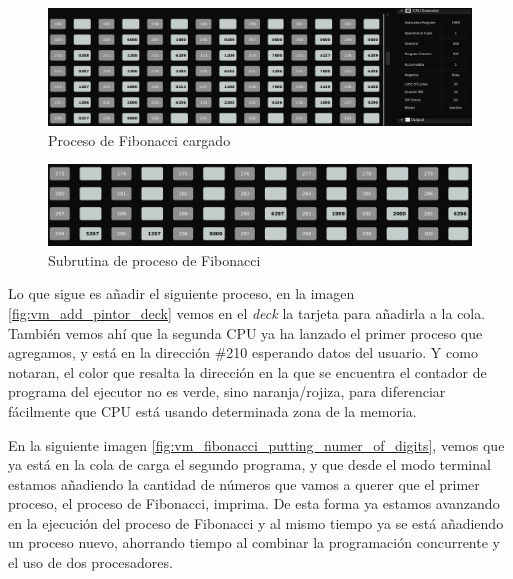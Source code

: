 \documentclass[letterpaper,12pt,oneside]{book}
\begin{document}
            \begin{figure}[H]		
				\centering
				\includegraphics[scale=0.3]{media/Paralela/vm_process_fibonacci_loaded_cut.png}
				\caption{Proceso de Fibonacci cargado}
				\label{fig:vm_process_fibonacci_loaded}
			\end{figure}
			
			\begin{figure}[H]		
				\centering
				\includegraphics[scale=0.35]{media/Paralela/vm_subrutine_fibonacci_cut.png}
				\caption{Subrutina de proceso de Fibonacci}
				\label{fig:vm_subrutine_fibonacci}
			\end{figure}
			
			
					
			
			
			
			
		
			Lo que sigue es añadir el siguiente proceso, en la imagen \ref{fig:vm_add_pintor_deck} vemos en el \textit{deck} la
			tarjeta para añadirla a la cola. También vemos ahí que la segunda CPU ya ha lanzado el primer proceso que agregamos,
			y está en la dirección \#210 esperando datos del usuario. Y como notaran, el color que resalta la dirección en la
			que se encuentra el contador de programa del ejecutor no es verde, sino naranja/rojiza, para diferenciar 
			fácilmente que CPU está usando determinada zona de la memoria.
		 	
			
			
			En la siguiente imagen \ref{fig:vm_fibonacci_putting_numer_of_digits}, vemos que ya está en la cola de carga
			el segundo programa, y que desde el modo terminal estamos añadiendo la cantidad de números que vamos a querer que
			el primer proceso, el proceso de Fibonacci, imprima. De esta forma ya estamos avanzando en la ejecución del proceso de Fibonacci
			y al mismo tiempo ya se está añadiendo un proceso nuevo, ahorrando tiempo al combinar la programación concurrente y el uso
			de dos procesadores.
			
\end{document}
